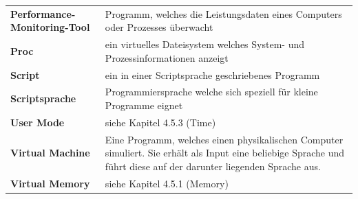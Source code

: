 \documentclass{fancydocument}
\begin{document}
\begin{tabularx}{\linewidth}{p{6.5cm}X}
\textbf{Performance-Monitoring-Tool}&Programm, welches die Leistungsdaten eines Computers oder Prozesses überwacht\\
\textbf{Proc}&ein virtuelles Dateisystem welches System- und Prozessinformationen anzeigt\\
\textbf{Script}&ein in einer Scriptsprache geschriebenes Programm\\
\textbf{Scriptsprache}&Programmiersprache welche sich speziell für kleine Programme eignet\\
\textbf{User Mode}&siehe Kapitel 4.5.3 (Time)\\
\textbf{Virtual Machine}&Eine Programm, welches einen physikalischen Computer simuliert. Sie erhält als Input eine beliebige Sprache und führt
diese auf der darunter liegenden Sprache aus.\\
\textbf{Virtual Memory}&siehe Kapitel 4.5.1 (Memory)\\
\end{tabularx}
\end{document}
